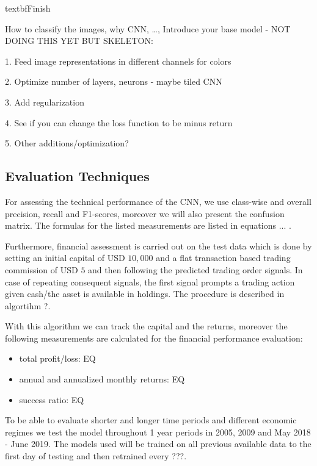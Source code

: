 \documentclass[11pt, a4paper]{article}
\begin{document}
textbf{Finish}


How to classify the images, why CNN, \dots, 
Introduce your base model - NOT DOING THIS YET BUT SKELETON:

1. Feed image representations in different channels for colors

2. Optimize number of layers, neurons - maybe tiled CNN

3. Add regularization

4. See if you can change the loss function to be minus return

5. Other additions/optimization?

\subsection{Evaluation Techniques}

For assessing the technical performance of the CNN, we use class-wise and overall precision, recall and F1-scores, moreover we will also present the confusion matrix. 
The formulas for the listed measurements are listed in equations ... .

Furthermore, financial assessment is carried out on the test data which is done by setting an initial capital of USD $10,000$ and a flat transaction based trading commission of USD $5$ and then following the predicted trading order signals.
In case of repeating consequent signals, the first signal prompts a trading action given cash/the asset is available in holdings. The procedure is described in algortihm ?.

With this algorithm we can track the capital and the returns, moreover the following measurements are calculated for the financial performance evaluation:

\begin{itemize}
    \item total profit/loss: EQ
    \item annual and annualized monthly returns: EQ
    \item success ratio: EQ 
\end{itemize}

To be able to evaluate shorter and longer time periods and different economic regimes we test the model throughout 1 year periods in 2005, 2009 and May 2018 - June 2019. The models used will be trained on all previous available data to the first day of testing and then retrained every ???.
\end{document}
